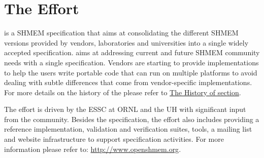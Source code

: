 
\section{The \openshmem Effort}

\openshmem is a SHMEM specification that aims at consolidating the different
SHMEM versions provided by vendors, laboratories and universities 
into a single widely accepted specification. \openshmem aims at addressing
current and future SHMEM community needs with a single specification. Vendors are starting to provide \openshmem implementations to help the users
write portable \openshmem code that can run on multiple platforms to avoid dealing with
subtle differences that come from vendor-specific implementations. For more details on the history of 
the \openshmem please refer to \hyperref[sec:openshmem_history]{The History of \openshmem section}.  

The \openshmem effort is driven by the \ac{ESSC} at \ac{ORNL} and the \ac{UH} 
with significant input from the \openshmem{} community. Besides the
specification, the effort also includes providing a reference \openshmem implementation,
validation and verification suites, tools, a mailing list and website infrastructure to support
specification activities.  For more information please refer to: \url{http://www.openshmem.org}.

